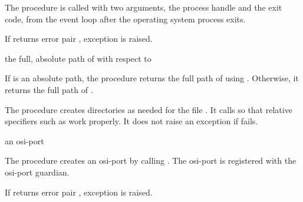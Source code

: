 The  procedure is called with two arguments, the process
handle and the exit code, from the event loop after the operating
system process exits.

If  returns error pair
, exception
 is raised.

\begin{procedure}
\end{procedure}
\returns{} the full, absolute path of  with respect to 

If  is an absolute path, the 
procedure returns the full path of  using
. Otherwise, it returns the full path of
.

\begin{procedure}
\end{procedure}
\returns{} 

The  procedure creates directories as
needed for the file . It calls
 so that relative specifiers such
as  work properly. It does not raise an exception if
 fails.

\begin{procedure}
\end{procedure}
\returns{} an osi-port

The  procedure creates an osi-port by calling
. The osi-port is
registered with the osi-port guardian.

If  returns error pair , exception  is raised.

